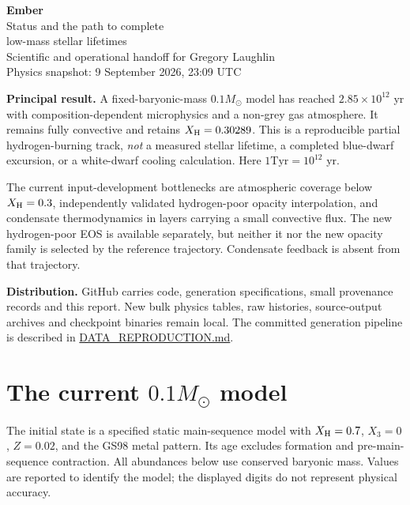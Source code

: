 \documentclass[11pt,letterpaper]{article}
\newcommand{\Ms}{M_\odot}
\newcommand{\Tyr}{\mathrm{Tyr}}
\newcommand{\doc}[2]{\href{https://github.com/oklo/ember/blob/master/#1}{#2}}
\begin{document}
\begin{center}
{\LARGE\bfseries\textcolor{ember}{Ember}}\\[6pt]
{\Large Status and the path to complete\\low-mass stellar lifetimes}\\[8pt]
{\normalsize Scientific and operational handoff for Gregory Laughlin}\\[3pt]
{\small Physics snapshot: 9 September 2026, 23:09 UTC}
\end{center}

\textbf{Principal result.} A fixed-baryonic-mass $0.1\Ms$ model has reached
$2.85\times10^{12}$ yr with composition-dependent microphysics and a non-grey
gas atmosphere. It remains fully convective and retains $X_{\rm H}=0.30289$.
This is a reproducible partial hydrogen-burning track, \emph{not} a measured
stellar lifetime, a completed blue-dwarf excursion, or a white-dwarf cooling
calculation. Here $1\Tyr=10^{12}$ yr.

The current input-development bottlenecks are atmospheric coverage below
$X_{\rm H}=0.3$, independently validated hydrogen-poor opacity interpolation,
and condensate thermodynamics in layers carrying a small convective flux.
The new hydrogen-poor EOS is available separately, but neither it nor the
new opacity family is selected by the reference trajectory. Condensate
feedback is absent from that trajectory.

\textbf{Distribution.} GitHub carries code, generation specifications, small
provenance records and this report. New bulk physics tables, raw histories,
source-output archives and checkpoint binaries remain local. The committed
generation pipeline is described in \doc{docs/DATA_REPRODUCTION.md}{DATA\_REPRODUCTION.md}.

\section{The current $0.1\Ms$ model}
The initial state is a specified static main-sequence model with
$X_{\rm H}=0.7$, $X_3=0$, $Z=0.02$, and the GS98 metal pattern.
Its age excludes formation and pre-main-sequence contraction. All abundances
below use conserved baryonic mass. Values are reported to identify the model;
the displayed digits do not represent physical accuracy.
\end{document}
